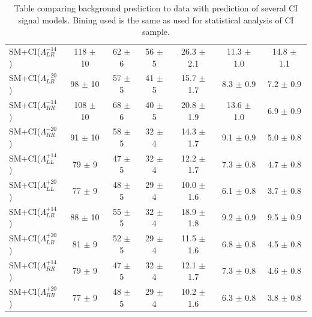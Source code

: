\begin {table}[h]
\begin{center}
\begin{tabular}{  l | c c c | c c c  }
			SM+CI($\Lambda^{-14}_{LR}$) & 118 $\pm$ 10 & 62 $\pm$ 6 & 56 $\pm$ 5 & 26.3 $\pm$ 2.1 & 11.3 $\pm$ 1.0 & 14.8 $\pm$ 1.1 \\
			SM+CI($\Lambda^{-20}_{LR}$) & 98 $\pm$ 10 & 57 $\pm$ 5 & 41 $\pm$ 5 & 15.7 $\pm$ 1.7 & 8.3 $\pm$ 0.9 & 7.2 $\pm$ 0.9 \\
			SM+CI($\Lambda^{-14}_{RR}$) & 108 $\pm$ 10 & 68 $\pm$ 6 & 40 $\pm$ 5 & 20.8 $\pm$ 1.9 & 13.6 $\pm$ 1.0 & 6.9 $\pm$ 0.9 \\
			SM+CI($\Lambda^{-20}_{RR}$) & 91 $\pm$ 10 & 58 $\pm$ 5 & 32 $\pm$ 4 & 14.3 $\pm$ 1.7 & 9.1 $\pm$ 0.9 & 5.0 $\pm$ 0.8 \\
			\hline
			SM+CI($\Lambda^{+14}_{LL}$) & 79 $\pm$ 9 & 47 $\pm$ 5 & 32 $\pm$ 4 & 12.2 $\pm$ 1.7 & 7.3 $\pm$ 0.8 & 4.7 $\pm$ 0.8 \\
			SM+CI($\Lambda^{+20}_{LL}$) & 77 $\pm$ 9 & 48 $\pm$ 5 & 29 $\pm$ 4 & 10.0 $\pm$ 1.6 & 6.1 $\pm$ 0.8 & 3.7 $\pm$ 0.8 \\
			SM+CI($\Lambda^{+14}_{LR}$) & 88 $\pm$ 10 & 55 $\pm$ 5 & 32 $\pm$ 4 & 18.9 $\pm$ 1.8 & 9.2 $\pm$ 0.9 & 9.5 $\pm$ 0.9 \\
			SM+CI($\Lambda^{+20}_{LR}$) & 81 $\pm$ 9 & 52 $\pm$ 5 & 29 $\pm$ 4 & 11.5 $\pm$ 1.6 & 6.8 $\pm$ 0.8 & 4.5 $\pm$ 0.8 \\
			SM+CI($\Lambda^{+14}_{RR}$) & 79 $\pm$ 9 & 47 $\pm$ 5 & 32 $\pm$ 4 & 12.1 $\pm$ 1.7 & 7.3 $\pm$ 0.8 & 4.6 $\pm$ 0.8 \\
			SM+CI($\Lambda^{+20}_{RR}$) & 77 $\pm$ 9 & 48 $\pm$ 5 & 29 $\pm$ 4 & 10.2 $\pm$ 1.6 & 6.3 $\pm$ 0.8 & 3.8 $\pm$ 0.8 \\
			\hline
		\end{tabular}
	  	\caption{Table comparing background prediction to data with prediction of several CI signal models. Bining used is the same as used for statistical analysis of CI sample.}
	  	\label{tab:CI_results2}
	  	\end{center}
	\end {table}



